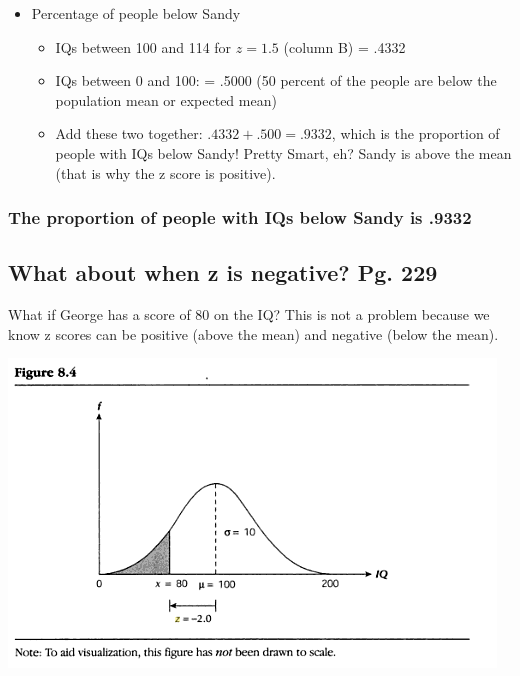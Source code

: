 \documentclass[]{article}
\begin{document}
\begin{itemize}
\itemsep1pt\parskip0pt
\item
  Percentage of people below Sandy

  \begin{itemize}
  \itemsep1pt\parskip0pt
  \item
    IQs between 100 and 114 for $z=1.5$ (column B) = .4332
  \item
    IQs between 0 and 100: = .5000 (50 percent of the people are below
    the population mean or expected mean)
  \item
    Add these two together: $.4332 + .500 = .9332$, which is the
    proportion of people with IQs below Sandy! Pretty Smart, eh? Sandy
    is above the mean (that is why the z score is positive).
  \end{itemize}
\end{itemize}

\subsubsection{The proportion of people with IQs below Sandy is
.9332}\label{the-proportion-of-people-with-iqs-below-sandy-is-.9332}

\subsection{What about when z is negative? Pg.
229}\label{what-about-when-z-is-negative-pg.-229}

What if George has a score of 80 on the IQ? This is not a problem
because we know z scores can be positive (above the mean) and negative
(below the mean).

\includegraphics{george1.png}
\end{document}
